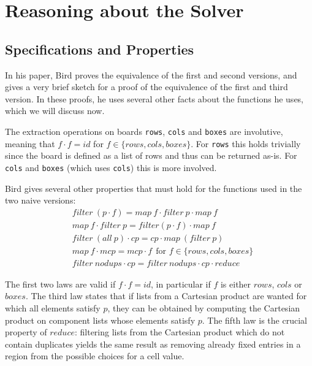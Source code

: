 \documentclass[a4paper,11pt]{article}
\begin{document}
\section{Reasoning about the Solver}
\label{sec:reas}


\subsection{Specifications and Properties}
In his paper, Bird proves the equivalence of the first and second versions, and gives a very brief sketch for a proof of the equivalence of the first and third version. In these proofs, he uses several other facts about the functions he uses, which we will discuss now.
 
The extraction operations on boards \texttt{rows}, \texttt{cols} and \texttt{boxes} are involutive, meaning that \(f \cdot f = id\) for \(f \in \{rows,cols,boxes\}\). For \texttt{rows} this holds trivially since the board is defined as a list of rows and thus can be returned as-is. For \texttt{cols} and \texttt{boxes} (which uses \texttt{cols}) this is more involved. 

Bird gives several other properties that must hold for the functions used in the two naive versions:
\begin{align}
  &filter~(p \cdot f) = map~f \cdot filter~p \cdot map~f\\
  &map~f \cdot filter~p = filter (p \cdot f ) \cdot map~f\\
  &filter~(all~p) \cdot cp = cp \cdot map~(filter~p)\\
  &map~f \cdot mcp = mcp \cdot f~~\text{for \(f \in \{rows,cols,boxes\}\)}\\
  &filter~nodups \cdot cp = filter~nodups \cdot cp \cdot reduce
\end{align}

The first two laws are valid if \(f \cdot f = id\), in particular if \(f\) is either \(rows\), \(cols\) or \(boxes\).
The third law states that if lists from a Cartesian product are wanted for which all elements satisfy \(p\), they can be obtained by computing the Cartesian product on component lists whose elements satisfy \(p\).
The fifth law is the crucial property of \(reduce\): filtering lists from the Cartesian product which do not contain duplicates yields the same result as removing already fixed entries in a region from the possible choices for a cell value. 
\end{document}
